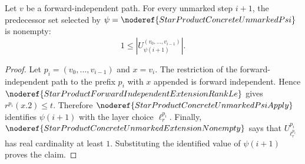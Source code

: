 \begin{lemma}
Let \(v\) be a forward-independent path.  For every unmarked step
\(i+1\), the predecessor set selected by
\(\psi=\noderef{StarProductConcreteUnmarkedPsi}\) is nonempty:
\[
  1\le |U_{\psi(i+1)}^{(v_0,\ldots,v_{i-1})}|.
\]
\end{lemma}
\begin{proof}
Let \(p_i=(v_0,\ldots,v_{i-1})\) and \(x=v_i\).  The restriction of the
forward-independent path to the prefix \(p_i\) with \(x\) appended is forward
independent.  Hence \(\noderef{StarProductForwardIndependentExtensionRankLe}\)
gives \(r^{p_i}(x.2)\le t\).  Therefore
\(\noderef{StarProductConcreteUnmarkedPsiApply}\) identifies
\(\psi(i+1)\) with the layer choice \(\ell_{r}^{p_i}\).  Finally,
\(\noderef{StarProductConcreteUnmarkedExtensionNonempty}\) says that
\(U_{\ell_r^{p_i}}^{p_i}\) has real cardinality at least \(1\).  Substituting
the identified value of \(\psi(i+1)\) proves the claim.
\end{proof}
